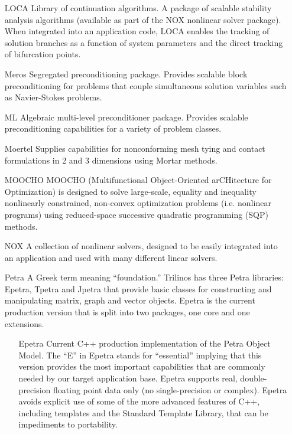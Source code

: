 \begin{itemize}
\item[LOCA]
Library of continuation algorithms. A package of scalable stability 
analysis algorithms (available as part of 
the NOX nonlinear solver package). When integrated into an application code, 
LOCA enables the tracking of solution branches as a function of system 
parameters and the direct tracking of bifurcation points.

\item[Meros]
Segregated preconditioning package.  Provides scalable block
preconditioning for problems that couple simultaneous solution
variables such as Navier-Stokes problems. 

\item[ML]
Algebraic multi-level preconditioner package.  Provides scalable
preconditioning capabilities for a variety of problem classes.  

\item[Moertel]
Supplies capabilities for nonconforming mesh tying and contact
formulations in 2 and 3 dimensions using Mortar methods.

\item[MOOCHO]
MOOCHO (Multifunctional Object-Oriented arCHitecture for Optimization) is
designed to solve large-scale, equality and inequality nonlinearly
constrained, non-convex optimization problems (i.e. nonlinear programs)
using reduced-space successive quadratic programming (SQP) methods. 

\item[NOX]
A collection of nonlinear solvers, designed to be easily integrated
into an application and used with many different linear solvers.

\item[Petra]
A Greek term meaning ``foundation.''  Trilinos has three Petra 
libraries: Epetra, Tpetra and Jpetra that provide basic classes 
for constructing and manipulating matrix, graph and vector
objects.  Epetra is the current production version that is
split into two packages, one core and one extensions.

\begin{itemize}

\item[Epetra] Current C++ production implementation of the Petra
Object Model.  The ``E'' in Epetra stands for ``essential'' implying
that this version provides the most important capabilities that are
commonly needed by our target application base.  Epetra supports real,
double-precision floating point data only (no single-precision or
complex).  Epetra avoids explicit use of some of the more
advanced features of C++, including templates and the Standard
Template Library, that can be impediments to portability.


\end{itemize}
\end{itemize}
